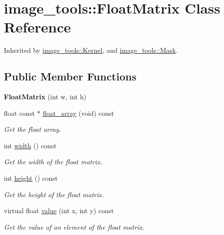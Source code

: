 \hypertarget{classimage__tools_1_1FloatMatrix}{}\section{image\+\_\+tools\+:\+:Float\+Matrix Class Reference}
\label{classimage__tools_1_1FloatMatrix}


Inherited by \hyperlink{classimage__tools_1_1Kernel}{image\+\_\+tools\+::\+Kernel}, and \hyperlink{classimage__tools_1_1Mask}{image\+\_\+tools\+::\+Mask}.

\subsection*{Public Member Functions}
\begin{DoxyCompactItemize}
\item 
{\bfseries Float\+Matrix} (int w, int h)\hypertarget{classimage__tools_1_1FloatMatrix_a98708d33731113bdd36d59698ff77418}{}\label{classimage__tools_1_1FloatMatrix_a98708d33731113bdd36d59698ff77418}

\item 
float const $\ast$ \hyperlink{classimage__tools_1_1FloatMatrix_aaa3e2ed3de0582b4411c5b48e524181e}{float\+\_\+array} (void) const 
\begin{DoxyCompactList}\small\item\em Get the float array. \end{DoxyCompactList}\item 
int \hyperlink{classimage__tools_1_1FloatMatrix_af4020870b09ec5b6bf90776e52fbc8b3}{width} () const 
\begin{DoxyCompactList}\small\item\em Get the width of the float matrix. \end{DoxyCompactList}\item 
int \hyperlink{classimage__tools_1_1FloatMatrix_aa053954b03eb71794f0e6eeeb0567f19}{height} () const 
\begin{DoxyCompactList}\small\item\em Get the height of the float matrix. \end{DoxyCompactList}\item 
virtual float \hyperlink{classimage__tools_1_1FloatMatrix_ab376dde20ee04b3ed91b033e92f8f5c7}{value} (int x, int y) const 
\begin{DoxyCompactList}\small\item\em Get the value of an element of the float matrix. \end{DoxyCompactList}\end{DoxyCompactItemize}
